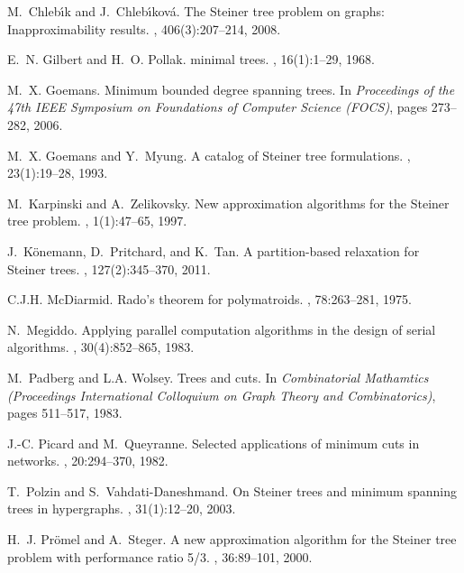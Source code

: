 \documentclass[11pt, letterpaper]{article}
\theoremstyle{definition}
\begin{document}
\begin{thebibliography}{10}
M.~Chleb\'{\i}k and J.~Chleb\'{\i}kov{\'a}.
\newblock The {S}teiner tree problem on graphs: Inapproximability results.
, 406(3):207--214, 2008.

E.~N. Gilbert and H.~O. Pollak.
 minimal trees.
, 16(1):1--29, 1968.

M.~X. Goemans.
\newblock Minimum bounded degree spanning trees.
\newblock In {\em Proceedings of the 47th IEEE Symposium on Foundations of
  Computer Science (FOCS)}, pages 273--282, 2006.

M.~X. Goemans and Y.~Myung.
\newblock A catalog of {S}teiner tree formulations.
, 23(1):19--28, 1993.

M.~Karpinski and A.~Zelikovsky.
\newblock New approximation algorithms for the {S}teiner tree problem.
, 1(1):47--65, 1997.

J.~K{\"o}nemann, D.~Pritchard, and K.~Tan.
\newblock A partition-based relaxation for {S}teiner trees.
, 127(2):345--370, 2011.

C.J.H. McDiarmid.
\newblock Rado's theorem for polymatroids.
, 78:263--281, 1975.

N.~Megiddo.
\newblock Applying parallel computation algorithms in the design of serial
  algorithms.
, 30(4):852--865, 1983.

M.~Padberg and L.A. Wolsey.
\newblock Trees and cuts.
\newblock In {\em Combinatorial Mathamtics (Proceedings International
  Colloquium on Graph Theory and Combinatorics)}, pages 511--517, 1983.

J.-C. Picard and M.~Queyranne.
\newblock Selected applications of minimum cuts in networks.
, 20:294--370, 1982.

T.~Polzin and S.~Vahdati-Daneshmand.
\newblock On {Steiner} trees and minimum spanning trees in hypergraphs.
, 31(1):12--20, 2003.

H.~J. Pr{\"o}mel and A.~Steger.
\newblock A new approximation algorithm for the {S}teiner tree problem with
  performance ratio 5/3.
, 36:89--101, 2000.


\end{thebibliography}
\end{document}
